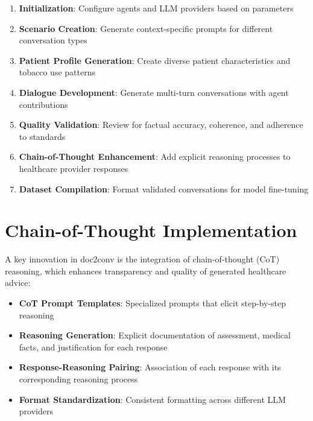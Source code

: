 \begin{enumerate}
    \item \textbf{Initialization}: Configure agents and LLM providers based on parameters
    
    \item \textbf{Scenario Creation}: Generate context-specific prompts for different conversation types
    
    \item \textbf{Patient Profile Generation}: Create diverse patient characteristics and tobacco use patterns
    
    \item \textbf{Dialogue Development}: Generate multi-turn conversations with agent contributions
    
    \item \textbf{Quality Validation}: Review for factual accuracy, coherence, and adherence to standards
    
    \item \textbf{Chain-of-Thought Enhancement}: Add explicit reasoning processes to healthcare provider responses
    
    \item \textbf{Dataset Compilation}: Format validated conversations for model fine-tuning
\end{enumerate}

\section{Chain-of-Thought Implementation}

A key innovation in doc2conv is the integration of chain-of-thought (CoT) reasoning, which enhances transparency and quality of generated healthcare advice:

\begin{itemize}
    \item \textbf{CoT Prompt Templates}: Specialized prompts that elicit step-by-step reasoning
    
    \item \textbf{Reasoning Generation}: Explicit documentation of assessment, medical facts, and justification for each response
    
    \item \textbf{Response-Reasoning Pairing}: Association of each response with its corresponding reasoning process
    
    \item \textbf{Format Standardization}: Consistent formatting across different LLM providers
\end{itemize}

